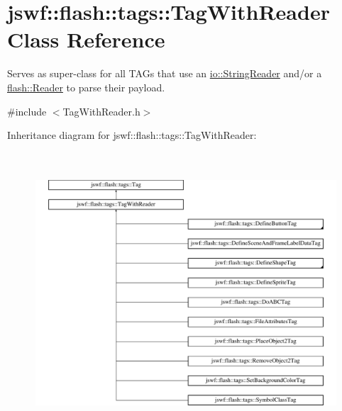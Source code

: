 \hypertarget{classjswf_1_1flash_1_1tags_1_1_tag_with_reader}{\section{jswf\+:\+:flash\+:\+:tags\+:\+:Tag\+With\+Reader Class Reference}
\label{classjswf_1_1flash_1_1tags_1_1_tag_with_reader}
}


Serves as super-\/class for all {\ttfamily T\+A\+G}s that use an \hyperlink{classjswf_1_1io_1_1_string_reader}{io\+::\+String\+Reader} and/or a \hyperlink{classjswf_1_1flash_1_1_reader}{flash\+::\+Reader} to parse their payload.  




{\ttfamily \#include $<$Tag\+With\+Reader.\+h$>$}

Inheritance diagram for jswf\+:\+:flash\+:\+:tags\+:\+:Tag\+With\+Reader\+:\begin{figure}[H]
\begin{center}
\leavevmode
\includegraphics[height=10.500000cm]{classjswf_1_1flash_1_1tags_1_1_tag_with_reader}
\end{center}
\end{figure}
